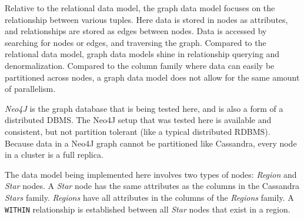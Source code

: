 Relative to the relational data model, the graph data model focuses on the relationship between various tuples.
Here data is stored in nodes as attributes, and relationships are stored as edges between nodes.
Data is accessed by searching for nodes or edges, and traversing the graph.
Compared to the relational data model, graph data models shine in relationship querying and denormalization.
Compared to the column family where data can easily be partitioned across nodes, a graph data model does not allow
for the same amount of parallelism.

\textit{Neo4J} is the graph database that is being tested here, and is also a form of a distributed DBMS\@.
The Neo4J setup that was tested here is available and consistent, but not partition tolerant (like a typical
distributed RDBMS).
Because data in a Neo4J graph cannot be partitioned like Cassandra, every node in a cluster is a full replica.

The data model being implemented here involves two types of nodes: \textit{Region} and \textit{Star} nodes.
A \textit{Star} node has the same attributes as the columns in the Cassandra \textit{Stars} family.
\textit{Regions} have all attributes in the columns of the \textit{Regions} family.
A \texttt{WITHIN} relationship is established between all \textit{Star} nodes that exist in a region.

